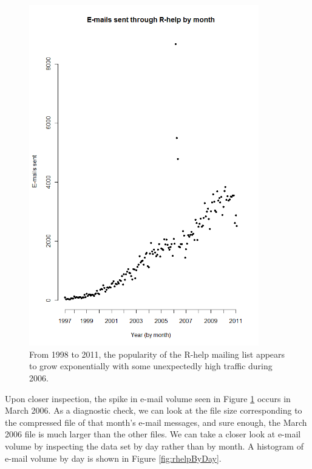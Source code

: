 \documentclass[12pt, a4paper, oneside]{amsart}
\begin{document}
\begin{figure}[htp]
\centering
\includegraphics[width = 100mm]{rhelpByMonth.png}
\caption{From 1998 to 2011, the popularity of the R-help mailing list appears to grow exponentially with some unexpectedly high traffic during 2006.}\label{fig:rhelpByMonth}
\end{figure}

Upon closer inspection, the spike in e-mail volume seen in Figure \ref{fig:rhelpByMonth} occurs in March 2006.  As a diagnostic check, we can look at the file size corresponding to the compressed file of that month's e-mail messages, and sure enough, the March 2006 file is much larger than the other files.  We can take a closer look at e-mail volume by inspecting the data set by day rather than by month.  A histogram of e-mail volume by day is shown in Figure \ref{fig:rhelpByDay}.
\end{document}
